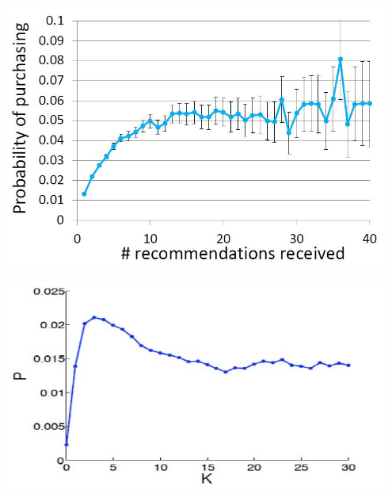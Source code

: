 {
\centering
\includegraphics[width=0.95\textwidth]{notes/img/l13_p47_dvd.JPG} \par
}

{
\centering
\includegraphics[width=0.95\textwidth]{notes/img/l13_p50_twitter.JPG} \par
}
